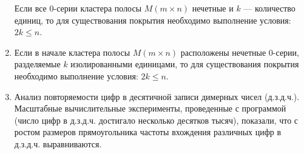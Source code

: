 \begin{enumerate}
Если все 0-серии кластера полосы $M (m\times n)$ нечетные и $k$ ---  количество единиц, то
 для существования покрытия необходимо выполнение условия: $2k\leq n$.
\item
Если в начале кластера полосы $M (m\times n)$ расположены нечетные 0-серии, разделяемые $k$ изолированными единицами, то
 для существования покрытия необходимо выполнение условия: $2k\leq n$.

\item
Анализ повторяемости цифр в десятичной записи димерных чисел (д.з.д.ч.). Масштабные вычислительные эксперименты, проведенные с программой (число цифр в д.з.д.ч. достигало несколько десятков тысяч), показали, что с ростом размеров прямоугольника частоты вхождения различных цифр в д.з.д.ч. выравниваются. 

\end{enumerate}
